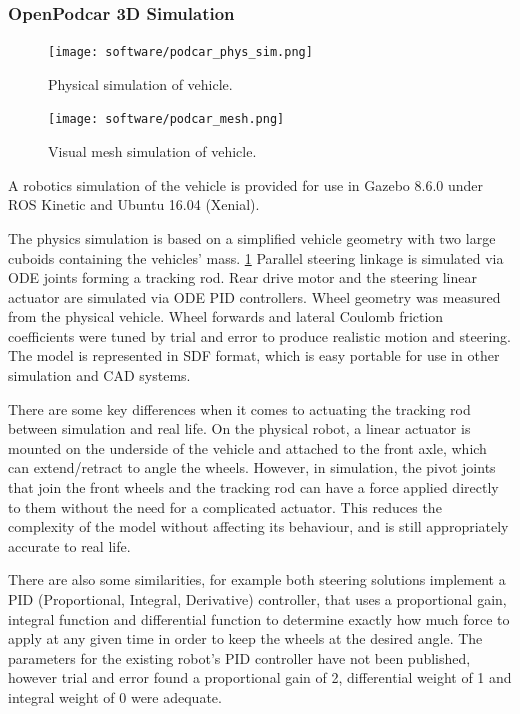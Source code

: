 \documentclass[a4paper]{article}
\begin{document}

\subsubsection{OpenPodcar 3D Simulation}

\begin{figure}
	\texttt{[image: software/podcar\_phys\_sim.png]}
	\caption{Physical simulation of vehicle.}
	\label{fig:physSim}
\end{figure}

\begin{figure}
	\texttt{[image: software/podcar\_mesh.png]}
	\caption{Visual mesh simulation of vehicle.}
	\label{fig:meshSim}
\end{figure}

A robotics simulation of the vehicle is provided for use in Gazebo 8.6.0 under ROS Kinetic and Ubuntu 16.04 (Xenial).


The physics simulation is based on a simplified vehicle geometry with two large cuboids containing the vehicles’ mass. \ref{fig:physSim} Parallel steering linkage is simulated via ODE joints forming a tracking rod. Rear drive motor and the steering linear actuator are simulated via ODE PID controllers.  Wheel geometry was measured from the physical vehicle.   Wheel forwards and lateral Coulomb friction coefficients were tuned by trial and error to produce realistic motion and steering.  The model is represented in SDF format, which is easy portable for use in other simulation and CAD systems.

There are some key differences when it comes to actuating the tracking rod between simulation and real life. On the physical robot, a linear actuator is mounted on the underside of the vehicle and attached to the front axle, which can extend/retract to angle the wheels. However, in simulation, the pivot joints that join the front wheels and the tracking rod can have a force applied directly to them without the need for a complicated actuator. This reduces the complexity of the model without affecting its behaviour, and is still appropriately accurate to real life.

There are also some similarities, for example both steering solutions implement a PID
(Proportional, Integral, Derivative) controller, that uses a proportional gain, integral function
and differential function to determine exactly how much force to apply at any given time in
order to keep the wheels at the desired angle. The parameters for the existing robot’s PID
controller have not been published, however trial and error found a proportional gain of 2,
differential weight of 1 and integral weight of 0 were adequate.
\end{document}
